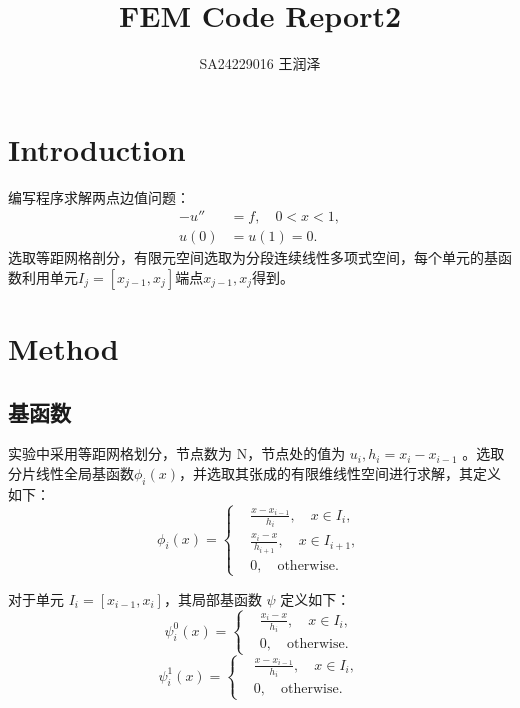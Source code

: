 \documentclass[11pt]{ctexart}
\title{FEM Code Report2}
\author{SA24229016 王润泽}
\begin{document}
\maketitle

\section{Introduction}
编写程序求解两点边值问题：
\begin{equation}
     \begin{aligned}
          -u'' &= f, \quad 0 < x < 1, \\
          u(0) &= u(1) = 0.
     \end{aligned}
\end{equation}
选取等距网格剖分，有限元空间选取为分段连续线性多项式空间，每个单元的基函数利用单元$ I_j = [x_{j-1},x_j] $端点$x_{j-1}, x_j$得到。

\section{Method}
\subsection{基函数}
实验中采用等距网格划分，节点数为 N，节点处的值为 $ u_i ,h_i = x_{i}-x_{i-1}$ 。选取分片线性全局基函数$ \phi_i(x) $，并选取其张成的有限维线性空间进行求解，其定义如下：
\begin{equation}
     \phi_i(x) = \left\{
          \begin{aligned}
               &\frac{x-x_{i-1}}{h_i}, \quad x \in I_{i}, \\
               &\frac{x_i-x}{h_{i+1}}, \quad x \in I_{i+1}, \\
               &0, \quad \text{otherwise}.
          \end{aligned}
     \right.
\end{equation}

对于单元 $ I_i = [x_{i-1},x_i] $，其局部基函数 $ \psi $ 定义如下：
\begin{equation}
     \psi^0_i(x) = \left\{
          \begin{aligned}
               &\frac{x_i-x}{h_i}, \quad x \in I_{i}, \\
               &0, \quad \text{otherwise}.
          \end{aligned}
     \right.
\end{equation}
\begin{equation}
     \psi^1_i(x) = \left\{
          \begin{aligned}
               &\frac{x-x_{i-1}}{h_i}, \quad x \in I_{i}, \\
               &0, \quad \text{otherwise}.
          \end{aligned}
     \right.
\end{equation}
\end{document}
